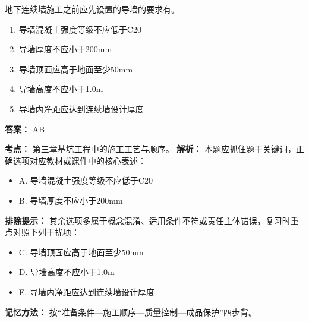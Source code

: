 \documentclass[UTF8,fontset=fandol,11pt]{ctexart}
\begin{document}
\begin{quizbox}[title={第 4 题}]
地下连续墙施工之前应先设置的导墙的要求有。\\
\begin{enumerate}[label=\Alph*.]
\item 导墙混凝土强度等级不应低于C20
\item 导墙厚度不应小于200mm
\item 导墙顶面应高于地面至少50mm
\item 导墙高度不应小于1.0m
\item 导墙内净距应达到连续墙设计厚度
\end{enumerate}
\textbf{答案：} AB
\vspace{0.25em}
\begin{answerbox}[title={考点解析}]
\textbf{考点：} 第三章基坑工程中的施工工艺与顺序。
\textbf{解析：} 本题应抓住题干关键词，正确选项对应教材或课件中的核心表述：
\begin{itemize}
\item A. 导墙混凝土强度等级不应低于C20
\item B. 导墙厚度不应小于200mm
\end{itemize}
\textbf{排除提示：} 其余选项多属于概念混淆、适用条件不符或责任主体错误，复习时重点对照下列干扰项：
\begin{itemize}
\item C. 导墙顶面应高于地面至少50mm
\item D. 导墙高度不应小于1.0m
\item E. 导墙内净距应达到连续墙设计厚度
\end{itemize}
\textbf{记忆方法：} 按“准备条件—施工顺序—质量控制—成品保护”四步背。
\end{answerbox}
\end{quizbox}

\vspace{0.2em}
\end{document}
